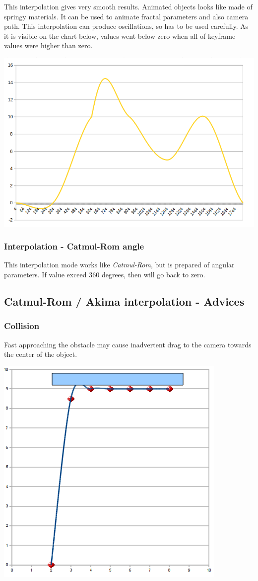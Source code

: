 This interpolation gives very smooth results. Animated objects looks like made
of springy materials. It can be used to animate fractal parameters and also
camera path. This interpolation can produce oscillations, so has to be used
carefully. As it is visible on the chart below, values went below zero when all
of keyframe values were higher than zero.

\includegraphics[width=0.5\linewidth]{img/manual/media/interpolation_catmulrom.png}

\subsubsection{Interpolation - Catmul-Rom
	angle}\label{interpolation-catmul-rom-angle}

This interpolation mode works like \emph{Catmul-Rom}, but is prepared of angular
parameters. If value exceed 360 degrees, then will go back to zero.

\subsection{Catmul-Rom / Akima interpolation -
	Advices}\label{catmul-rom-akima-interpolation---advices}

\subsubsection{Collision}\label{collision}

Fast approaching the obstacle may cause inadvertent drag to the camera towards
the center of the object. 
\nopagebreak

\includegraphics[width=0.4\linewidth]{img/manual/media/catmull-rom_collision.png}

